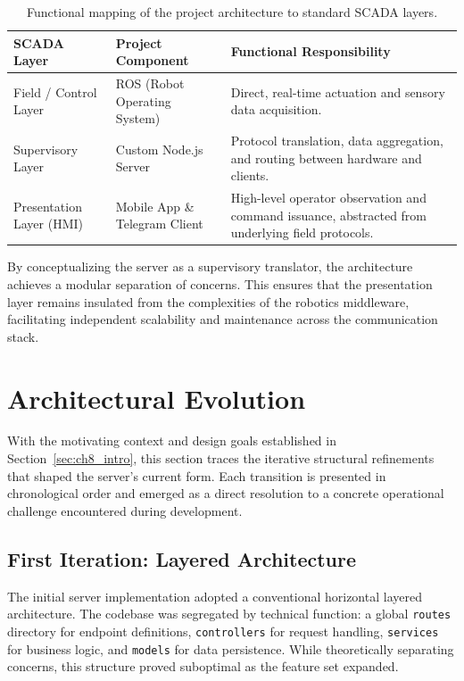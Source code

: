 \begin{table}[H]
    \centering
    \caption{Functional mapping of the project architecture to standard SCADA layers.}
    \begin{tabular}{|l|l|p{6cm}|}
        \hline
        \textbf{SCADA Layer} & \textbf{Project Component} & \textbf{Functional Responsibility} \\
        \hline
        Field / Control Layer & ROS (Robot Operating System) & Direct, real-time actuation and sensory data acquisition. \\
        \hline
        Supervisory Layer & Custom Node.js Server & Protocol translation, data aggregation, and routing between hardware and clients. \\
        \hline
        Presentation Layer (HMI) & Mobile App \& Telegram Client & High-level operator observation and command issuance, abstracted from underlying field protocols. \\
        \hline
    \end{tabular}

    \label{tab:scada_mapping}
\end{table}

By conceptualizing the server as a supervisory translator, the architecture achieves a modular separation of concerns. This ensures that the presentation layer remains insulated from the complexities of the robotics middleware, facilitating independent scalability and maintenance across the communication stack.

\section{Architectural Evolution}
\label{sec:ch8_evolution}

With the motivating context and design goals established in Section~\ref{sec:ch8_intro}, this section traces the iterative structural refinements that shaped the server's current form. Each transition is presented in chronological order and emerged as a direct resolution to a concrete operational challenge encountered during development.

\subsection{First Iteration: Layered Architecture}
\label{sec:ch8_layered}

The initial server implementation adopted a conventional horizontal layered architecture. The codebase was segregated by technical function: a global \texttt{routes} directory for endpoint definitions, \texttt{controllers} for request handling, \texttt{services} for business logic, and \texttt{models} for data persistence. While theoretically separating concerns, this structure proved suboptimal as the feature set expanded.

